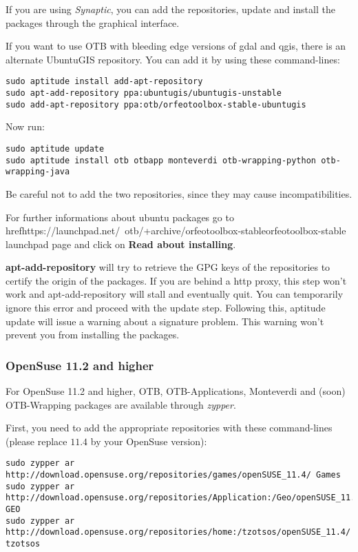 If you are using \emph{Synaptic}, you can add the repositories, update and install the packages through the
graphical interface.

If you want to use OTB with bleeding edge versions of gdal and qgis, there is an alternate UbuntuGIS repository.
You can add it by using these command-lines:
\begin{verbatim}
sudo aptitude install add-apt-repository 
sudo apt-add-repository ppa:ubuntugis/ubuntugis-unstable
sudo add-apt-repository ppa:otb/orfeotoolbox-stable-ubuntugis
\end{verbatim}
Now run:
\begin{verbatim}
sudo aptitude update
sudo aptitude install otb otbapp monteverdi otb-wrapping-python otb-wrapping-java
\end{verbatim}

Be careful not to add the two repositories, since they may cause incompatibilities.

For further informations about ubuntu packages go to href{https://launchpad.net/~otb/+archive/orfeotoolbox-stable}{orfeotoolbox-stable launchpad page} and click on \textbf{Read about installing}.

\textbf{apt-add-repository} will try to retrieve the GPG keys of the repositories to certify the origin of the packages. If you are behind a http proxy, this step won't work and apt-add-repository will stall and eventually quit. You can temporarily ignore this error and proceed with the update step. Following this, aptitude update will issue a warning about a signature problem. This warning won't prevent you from installing the packages.

\subsubsection{OpenSuse 11.2 and higher}
\label{ssec:opensuse_binaries}

For OpenSuse 11.2 and higher, OTB, OTB-Applications, Monteverdi and (soon)
OTB-Wrapping packages are available through \emph{zypper}.

First, you need to add the appropriate repositories with these command-lines (please replace $11.4$ by your OpenSuse version):
\begin{verbatim}
sudo zypper ar 
http://download.opensuse.org/repositories/games/openSUSE_11.4/ Games
sudo zypper ar 
http://download.opensuse.org/repositories/Application:/Geo/openSUSE_11.4/ GEO
sudo zypper ar 
http://download.opensuse.org/repositories/home:/tzotsos/openSUSE_11.4/ tzotsos
\end{verbatim}

